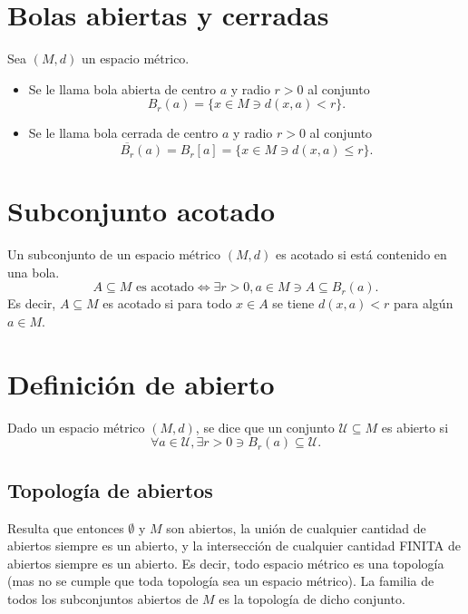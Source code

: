 \documentclass{article}
\renewcommand{\headrulewidth}{2pt}
\begin{document}
\section*{Bolas abiertas y cerradas}

Sea $(M,d)$ un espacio métrico.
\begin{itemize}
\item Se le llama bola abierta de centro $a$ y radio $r>0$ al conjunto
\[B_r(a)=\{x\in M\ni d(x,a)<r\}.\]

\item Se le llama bola cerrada de centro $a$ y radio $r>0$ al conjunto
\[\overline{B_r}(a)=B_r[a]=\{x\in M\ni d(x,a)\leq r\}.\]


\end{itemize}

\section*{Subconjunto acotado}

Un subconjunto de un espacio métrico $(M,d)$ es acotado si está contenido en una bola.
\[\text{$A\subseteq M$ es acotado}\iff \exists r>0,a\in M \ni A\subseteq B_r(a).\]
Es decir, $A\subseteq M$ es acotado si para todo $x\in A$ se tiene $d(x,a)<r$ para algún $a\in M$.

\pagestyle{fancy}
\fancyhf{}
\renewcommand{\headrulewidth}{2pt}
\fancyfoot{}
\rfoot{\thepage}
\lfoot{}
\setlength{\headheight}{28pt}

\section*{Definición de abierto}

Dado un espacio métrico $(M,d)$, se dice que un conjunto $\mathcal{U}\subseteq M$ es abierto si
\[\forall a\in\mathcal{U}, \exists r>0 \ni B_r(a)\subseteq \mathcal{U}.\]

\subsection*{Topología de abiertos}
Resulta que entonces $\emptyset$ y $M$ son abiertos, la unión de cualquier cantidad de abiertos siempre es un abierto, y la intersección de cualquier cantidad FINITA de abiertos siempre es un abierto. Es decir, todo espacio métrico es una topología (mas no se cumple que toda topología sea un espacio métrico). La familia de todos los subconjuntos abiertos de $M$ es la topología de dicho conjunto.
\end{document}
